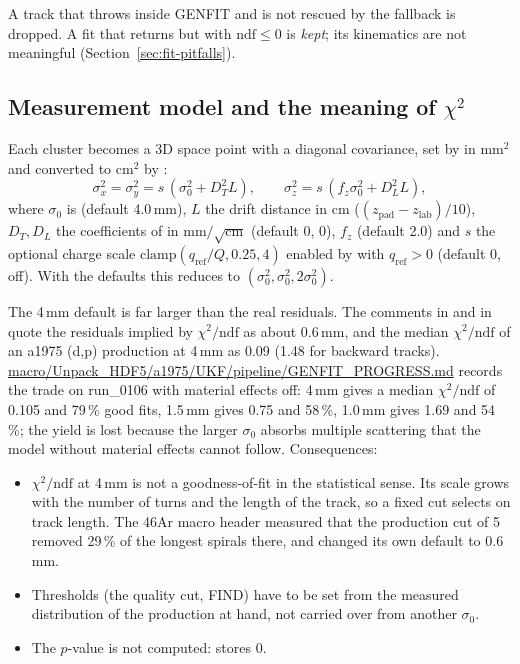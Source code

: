 A track that throws inside GENFIT and is not rescued by the fallback is dropped. A fit that returns but with
$\mathrm{ndf}\le 0$ is \emph{kept}; its kinematics are not meaningful (Section~\ref{sec:fit-pitfalls}).

\subsection{Measurement model and the meaning of $\chi^2$}
\label{sec:gf-meas}

Each cluster becomes a 3D space point with a diagonal covariance, set by  in mm$^2$ and converted to
cm$^2$ by :
\[
  \sigma_x^2=\sigma_y^2 = s\,(\sigma_0^2 + D_T^2 L),\qquad
  \sigma_z^2 = s\,(f_z\sigma_0^2 + D_L^2 L),
\]
where $\sigma_0$ is  (default 4.0\,mm), $L$ the drift distance in cm
($(z_\mathrm{pad}-z_\mathrm{lab})/10$), $D_T, D_L$ the coefficients of  in
mm$/\sqrt{\mathrm{cm}}$ (default 0, 0), $f_z$  (default 2.0) and $s$ the optional charge scale
$\mathrm{clamp}(q_\mathrm{ref}/Q, 0.25, 4)$ enabled by  with $q_\mathrm{ref}>0$ (default
0, off). With the defaults this reduces to $(\sigma_0^2,\sigma_0^2,2\sigma_0^2)$.

The 4\,mm default is far larger than the real residuals. The comments in  and in
 quote the residuals implied by $\chi^2/\mathrm{ndf}$ as about 0.6\,mm, and the median
$\chi^2/\mathrm{ndf}$ of an a1975 (d,p) production at 4\,mm as 0.09 (1.48 for backward tracks).
\url{macro/Unpack_HDF5/a1975/UKF/pipeline/GENFIT_PROGRESS.md} records the trade on run\_0106 with material effects off:
4\,mm gives a median $\chi^2/\mathrm{ndf}$ of 0.105 and 79\,\% good fits, 1.5\,mm gives 0.75 and 58\,\%, 1.0\,mm gives
1.69 and 54\,\%; the yield is lost because the larger $\sigma_0$ absorbs multiple scattering that the model without
material effects cannot follow. Consequences:
\begin{itemize}
\item $\chi^2/\mathrm{ndf}$ at 4\,mm is not a goodness-of-fit in the statistical sense. Its scale grows with the number
  of turns and the length of the track, so a fixed cut selects on track length. The 46Ar macro header measured that the
  production cut of 5 removed 29\,\% of the longest spirals there, and changed its own default to 0.6\,mm.
\item Thresholds (the quality cut, FIND) have to be set from the measured distribution of the production at hand,
  not carried over from another $\sigma_0$.
\item The $p$-value is not computed:  stores 0.
\end{itemize}

